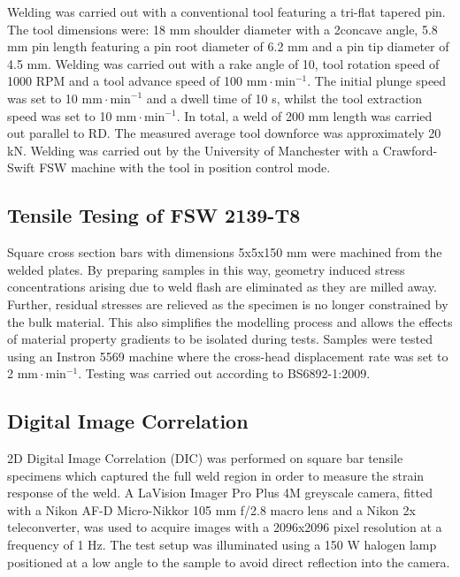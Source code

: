 Welding was carried out with a conventional tool featuring a tri-flat tapered pin. The tool dimensions were: 18 mm shoulder diameter with a 2\degree concave angle, 5.8 mm pin length featuring a pin root diameter of 6.2 mm and a pin tip diameter of 4.5 mm. Welding was carried out with a rake angle of 10\degree, tool rotation speed of 1000 RPM and a tool advance speed of 100 $\text{mm}\!\cdot\!\text{min}^{-1}$. The initial plunge speed was set to 10 $\text{mm}\!\cdot\!\text{min}^{-1}$ and a dwell time of 10 s, whilst the tool extraction speed was set to 10 $\text{mm}\!\cdot\!\text{min}^{-1}$. In total, a weld of 200 mm length was carried out parallel to RD. The measured average tool downforce was approximately 20 kN. Welding was carried out by the University of Manchester with a Crawford-Swift FSW machine with the tool in position control mode.

\subsection{Tensile Tesing of FSW 2139-T8}
\label{EMTensileTesting}
Square cross section bars with dimensions 5x5x150 mm were machined from the welded plates. By preparing samples in this way, geometry induced stress concentrations arising due to weld flash are eliminated as they are milled away. Further, residual stresses are relieved as the specimen is no longer constrained by the bulk material. This also simplifies the modelling process and allows the effects of material property gradients to be isolated during tests. Samples were tested using an Instron 5569 machine where the cross-head displacement rate was set to 2 $\text{mm}\!\cdot\!\text{min}^{-1}$. Testing was carried out according to BS6892-1:2009.
\subsection{Digital Image Correlation}
\label{EMDIC}
2D Digital Image Correlation (DIC)  \cite{DaFonseca2005} was performed on square bar tensile specimens which captured the full weld region in order to measure the strain response of the weld. A LaVision Imager Pro Plus 4M greyscale camera, fitted with a Nikon AF-D Micro-Nikkor 105 mm f/2.8 macro lens and a Nikon 2x teleconverter, was used to acquire images with a 2096x2096 pixel resolution at a frequency of 1 Hz. The test setup was illuminated using a 150 W halogen lamp positioned at a low angle to the sample to avoid direct reflection into the camera. 

